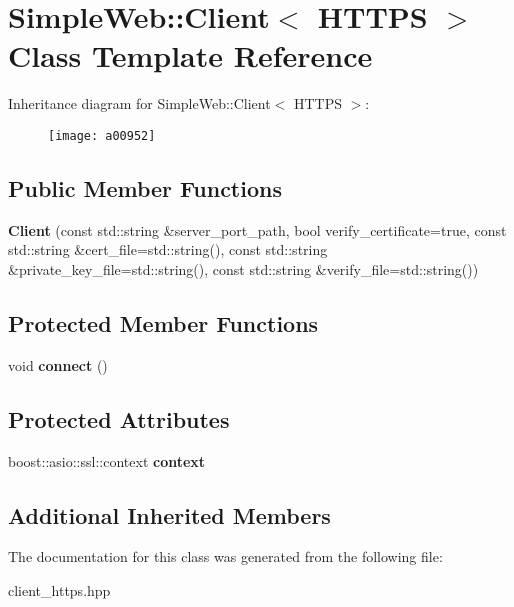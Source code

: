 \hypertarget{a00952}{}\section{Simple\+Web\+:\+:Client$<$ H\+T\+T\+PS $>$ Class Template Reference}
\label{a00952}
Inheritance diagram for Simple\+Web\+:\+:Client$<$ H\+T\+T\+PS $>$\+:\begin{figure}[H]
\begin{center}
\leavevmode
\texttt{[image: a00952]}
\end{center}
\end{figure}
\subsection*{Public Member Functions}
\begin{DoxyCompactItemize}
\item 
\mbox{\label{a00952_abd87d3dc08c9fed3a60f18c749b8bacd}} 
{\bfseries Client} (const std\+::string \&server\+\_\+port\+\_\+path, bool verify\+\_\+certificate=true, const std\+::string \&cert\+\_\+file=std\+::string(), const std\+::string \&private\+\_\+key\+\_\+file=std\+::string(), const std\+::string \&verify\+\_\+file=std\+::string())
\end{DoxyCompactItemize}
\subsection*{Protected Member Functions}
\begin{DoxyCompactItemize}
\item 
\mbox{\label{a00952_a833f6fd136e3158b873bee024d6e188c}} 
void {\bfseries connect} ()
\end{DoxyCompactItemize}
\subsection*{Protected Attributes}
\begin{DoxyCompactItemize}
\item 
\mbox{\label{a00952_afe57679cc6153d5d1fe8abc94a8fa58a}} 
boost\+::asio\+::ssl\+::context {\bfseries context}
\end{DoxyCompactItemize}
\subsection*{Additional Inherited Members}


The documentation for this class was generated from the following file\+:\begin{DoxyCompactItemize}
\item 
client\+\_\+https.\+hpp\end{DoxyCompactItemize}
